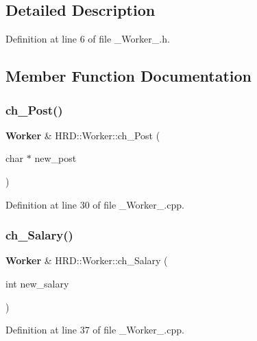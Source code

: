 \subsection{Detailed Description}


Definition at line 6 of file \+\_\+\+Worker\+\_\+.\+h.



\subsection{Member Function Documentation}
\mbox{\label{class_h_r_d_1_1_worker_a9234599c0ef3b17151b7e8a813e28581}} 
\subsubsection{ch\+\_\+\+Post()}
{\footnotesize\ttfamily \textbf{ Worker} \& H\+R\+D\+::\+Worker\+::ch\+\_\+\+Post (\begin{DoxyParamCaption}\item[{char $\ast$}]{new\+\_\+post }\end{DoxyParamCaption})}



Definition at line 30 of file \+\_\+\+Worker\+\_\+.\+cpp.

\mbox{\label{class_h_r_d_1_1_worker_a3d0ea5e210bd344170866c32ca5013da}} 
\subsubsection{ch\+\_\+\+Salary()}
{\footnotesize\ttfamily \textbf{ Worker} \& H\+R\+D\+::\+Worker\+::ch\+\_\+\+Salary (\begin{DoxyParamCaption}\item[{int}]{new\+\_\+salary }\end{DoxyParamCaption})}



Definition at line 37 of file \+\_\+\+Worker\+\_\+.\+cpp.

\mbox{\label{class_h_r_d_1_1_worker_a9e358b8861e16955d6fb11600a144782}} 
